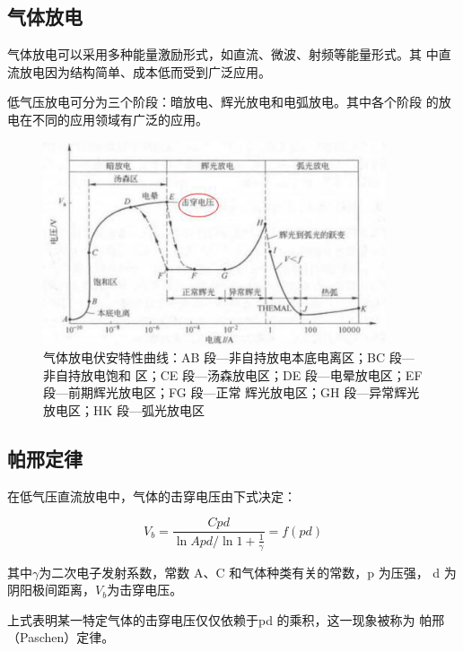 \documentclass[a4paper,UTF8]{ctexart}
\begin{document}
\subsection{气体放电}

气体放电可以采用多种能量激励形式，如直流、微波、射频等能量形式。其
中直流放电因为结构简单、成本低而受到广泛应用。

低气压放电可分为三个阶段：暗放电、辉光放电和电弧放电。其中各个阶段
的放电在不同的应用领域有广泛的应用。

\begin{figure}[H]
    \centering
    \begin{minipage}[b]{0.9\textwidth}
        \centering
        \includegraphics[width=0.9\textwidth]{./fig1.png}
        \caption{气体放电伏安特性曲线：AB 段—非自持放电本底电离区；BC 段—非自持放电饱和
区；CE 段—汤森放电区；DE 段—电晕放电区；EF 段—前期辉光放电区；FG 段—正常
辉光放电区；GH 段—异常辉光放电区；HK 段—弧光放电区}
    \end{minipage}
\end{figure}

\subsection{帕邢定律}

在低气压直流放电中，气体的击穿电压由下式决定：

\begin{equation}
    V_b = \frac{Cpd}{\ln{Apd/\ln{1+\frac{1}{\gamma}}}} = f(pd)
\end{equation}

其中$\gamma$为二次电子发射系数，常数 A、C 和气体种类有关的常数，p 为压强，
d 为阴阳极间距离，$V_b$为击穿电压。

上式表明某一特定气体的击穿电压仅仅依赖于pd 的乘积，这一现象被称为
帕邢（Paschen）定律。
\end{document}

